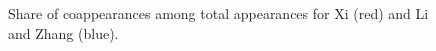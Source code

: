 \documentclass[11pt,english]{article}
\providecommand{\DIFaddbeginFL}{} %
\providecommand{\DIFaddendFL}{} %
\providecommand{\DIFdelbeginFL}{} %
\providecommand{\DIFdelendFL}{} %
\newcommand{\DIFscaledelfig}{0.5}
\newlength{\DIFdelgraphicswidth} %
\newlength{\DIFdelgraphicsheight} %
\newcommand{\DIFaddincludegraphics}[2][]{{\color{blue}\fbox{\DIFOincludegraphics[#1]{#2}}}} %
\newcommand{\DIFdelincludegraphics}[2][]{%
\sbox{\DIFdelgraphicsbox}{\DIFOincludegraphics[#1]{#2}}%
\settoboxwidth{\DIFdelgraphicswidth}{\DIFdelgraphicsbox} %
\settoboxtotalheight{\DIFdelgraphicsheight}{\DIFdelgraphicsbox} %
\scalebox{\DIFscaledelfig}{%
\parbox[b]{\DIFdelgraphicswidth}{\usebox{\DIFdelgraphicsbox}\\[-\baselineskip] \rule{\DIFdelgraphicswidth}{0em}}\llap{\resizebox{\DIFdelgraphicswidth}{\DIFdelgraphicsheight}{%
\setlength{\unitlength}{\DIFdelgraphicswidth}%
\begin{picture}(1,1)%
\thicklines\linethickness{2pt} %
{\color[rgb]{1,0,0}\put(0,0){\framebox(1,1){}}}%
{\color[rgb]{1,0,0}\put(0,0){\line( 1,1){1}}}%
{\color[rgb]{1,0,0}\put(0,1){\line(1,-1){1}}}%
\end{picture}%
}\hspace*{3pt}}} %
} %
\DeclareRobustCommand{\DIFaddbeginFL}{\DIFOaddbeginFL \let\includegraphics\DIFaddincludegraphics} %
\DeclareRobustCommand{\DIFaddendFL}{\DIFOaddendFL \let\includegraphics\DIFOincludegraphics} %
\DeclareRobustCommand{\DIFdelbeginFL}{\DIFOdelbeginFL \let\includegraphics\DIFdelincludegraphics} %
\DeclareRobustCommand{\DIFdelendFL}{\DIFOaddendFL \let\includegraphics\DIFOincludegraphics} %
\begin{document}
\begin{flushleft}
\noindent \begin{center}
\begin{figure}[H]
\noindent \begin{centering}
\DIFdelbeginFL %
\DIFdelendFL \DIFaddbeginFL {}
\DIFaddendFL \par\end{centering}
\noindent \begin{centering}
\DIFdelbeginFL %
\DIFdelendFL \DIFaddbeginFL {}
\DIFaddendFL \par\end{centering}
\caption{Share of coappearances among total appearances for Xi (red) and Li and Zhang (blue).}
\label{fig:coappFreqs}
\end{figure}
\par\end{center}


\end{flushleft}
\end{document}
